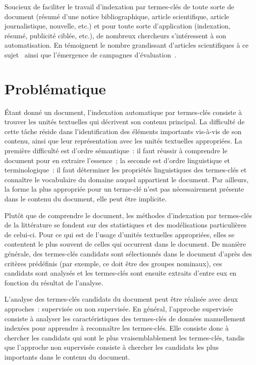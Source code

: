     Soucieux de faciliter le travail d'indexation par termes-clés de toute sorte
    de document (résumé d'une notice bibliographique, article scientifique,
    article journalistique, nouvelle, etc.) et pour toute sorte d'application
    (indexation, résumé, publicité ciblée, etc.), de nombreux chercheurs
    s'intéressent à son automatisation. En témoignent le nombre grandissant
    d'articles scientifiques à ce sujet~\cite{hasan2014state_of_the_art} ainsi
    que l'émergence de campagnes
    d'évaluation~\cite{kim2010semeval,paroubek2012deft}.


  \section{Problématique}
  \label{sec:main-introduction-problem_statement}
    Étant donné un document, l'indexation automatique par termes-clés consiste à
    trouver les unités textuelles qui décrivent son contenu principal. La
    difficulté de cette tâche réside dans l'identification des éléments
    importants vis-à-vis de son contenu, ainsi que leur représentation avec les
    unités textuelles appropriées. La première difficulté est d'ordre
    sémantique~: il faut réussir à comprendre le document pour en extraire
    l'essence~; la seconde est d'ordre linguistique et terminologique~: il faut
    déterminer les propriétés linguistiques des termes-clés et connaître le
    vocabulaire du domaine auquel appartient le document. Par ailleurs, la forme
    la plus appropriée pour un terme-clé n'est pas nécessairement présente dans
    le contenu du document, elle peut être implicite.

    Plutôt que de comprendre le document, les méthodes d'indexation par
    termes-clés de la littérature se fondent sur des statistiques et
    des modélisations particulières de celui-ci. Pour ce qui est de l'usage
    d'unités textuelles appropriées, elles se contentent le plus souvent de
    celles qui occurrent dans le document. De manière générale, des
    termes-clés candidats sont sélectionnés dans le document d'après des
    critères prédéfinis (par exemple, ce doit être des groupes nominaux), ces
    candidats sont analysés et les termes-clés sont ensuite extraits d'entre eux
    en fonction du résultat de l'analyse.

    L'analyse des termes-clés candidats du document peut être réalisée avec deux
    approches~: supervisée ou non supervisée. En général, l'approche supervisée
    consiste à analyser les caractéristiques des termes-clés de données
    manuellement indexées pour apprendre à reconnaître les termes-clés. Elle
    consiste donc à chercher les candidats qui sont le plus vraisemblablement
    les termes-clés, tandis que l'approche non supervisée consiste à chercher
    les candidats les plus importants dans le contenu du document.
    
